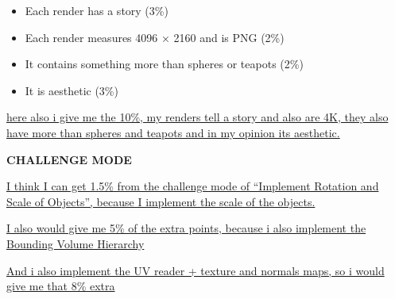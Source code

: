 \documentclass[
]{article}
\begin{document}
\begin{itemize}
\item
  Each render has a story (3\%)
\item
  Each render measures 4096 × 2160 and is PNG (2\%)
\item
  It contains something more than spheres or teapots (2\%)
\item
  It is aesthetic (3\%)
\end{itemize}

\ul{here also i give me the 10\%, my renders tell a story and also are
4K, they also have more than spheres and teapots and in my opinion its
aesthetic.}

\textbf{CHALLENGE MODE}

\ul{I think I can get 1.5\% from the challenge mode of ``Implement
Rotation and Scale of Objects'', because I implement the scale of the
objects.}

\ul{I also would give me 5\% of the extra points, because i also
implement the Bounding Volume Hierarchy}

\ul{And i also implement the UV reader + texture and normals maps, so i
would give me that 8\% extra}
\end{document}
